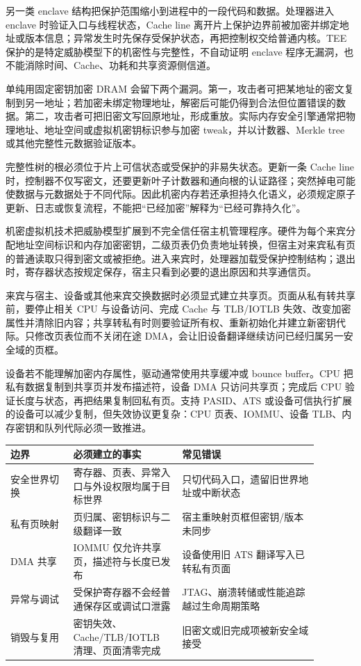 另一类 enclave 结构把保护范围缩小到进程中的一段代码和数据。处理器进入 enclave 时验证入口与线程状态，Cache line 离开片上保护边界前被加密并绑定地址或版本信息；异常发生时先保存受保护状态，再把控制权交给普通内核。TEE 保护的是特定威胁模型下的机密性与完整性，不自动证明 enclave 程序无漏洞，也不能消除时间、Cache、功耗和共享资源侧信道。


单纯用固定密钥加密 DRAM 会留下两个漏洞。第一，攻击者可把某地址的密文复制到另一地址；若加密未绑定物理地址，解密后可能仍得到合法但位置错误的数据。第二，攻击者可把旧密文写回原地址，形成重放。实际内存安全引擎通常把物理地址、地址空间或虚拟机密钥标识参与加密 tweak，并以计数器、Merkle tree 或其他完整性元数据验证版本。

完整性树的根必须位于片上可信状态或受保护的非易失状态。更新一条 Cache line 时，控制器不仅写密文，还要更新叶子计数器和通向根的认证路径；突然掉电可能使数据与元数据处于不同代际。因此机密内存若还承担持久化语义，必须规定原子更新、日志或恢复流程，不能把“已经加密”解释为“已经可靠持久化”。


机密虚拟机技术把威胁模型扩展到不完全信任宿主机管理程序。硬件为每个来宾分配地址空间标识和内存加密密钥，二级页表仍负责地址转换，但宿主对来宾私有页的普通读取只得到密文或被拒绝。进入来宾时，处理器加载受保护控制结构；退出时，寄存器状态按规定保存，宿主只看到必要的退出原因和共享通信页。

来宾与宿主、设备或其他来宾交换数据时必须显式建立共享页。页面从私有转共享前，要停止相关 CPU 与设备访问、完成 Cache 与 TLB/IOTLB 失效、改变加密属性并清除旧内容；共享转私有时则要验证所有权、重新初始化并建立新密钥代际。只修改页表位而不关闭在途 DMA，会让旧设备翻译继续访问已经归属另一安全域的页框。


设备若不能理解加密内存属性，驱动通常使用共享缓冲或 bounce buffer。CPU 把私有数据复制到共享页并发布描述符，设备 DMA 只访问共享页；完成后 CPU 验证长度与状态，再把结果复制回私有页。支持 PASID、ATS 或设备可信执行扩展的设备可以减少复制，但失效协议更复杂：CPU 页表、IOMMU、设备 TLB、内存密钥和队列代际必须一致推进。

\begin{longtable}{L{0.18\linewidth}L{0.31\linewidth}L{0.39\linewidth}}
\toprule
边界 & 必须建立的事实 & 常见错误 \\
\midrule
安全世界切换 & 寄存器、页表、异常入口与外设权限均属于目标世界 & 只切代码入口，遗留旧世界地址或中断状态 \\\tablerowrule
私有页映射 & 页归属、密钥标识与二级翻译一致 & 宿主重映射页框但密钥/版本未同步 \\\tablerowrule
DMA 共享 & IOMMU 仅允许共享页，描述符与长度已发布 & 设备使用旧 ATS 翻译写入已转私有页面 \\\tablerowrule
异常与调试 & 受保护寄存器不会经普通保存区或调试口泄露 & JTAG、崩溃转储或性能追踪越过生命周期策略 \\\tablerowrule
销毁与复用 & 密钥失效、Cache/TLB/IOTLB 清理、页面清零完成 & 旧密文或旧完成项被新安全域接受 \\
\bottomrule
\end{longtable}

